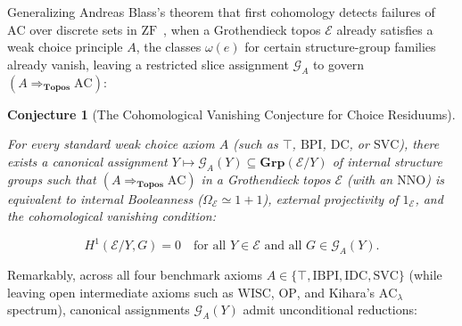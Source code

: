 \documentclass[10pt,twoside,openright]{book}
\theoremstyle{crmplain}
\newtheorem{conjecture}[theorem]{Conjecture}
\theoremstyle{crmdef}
\theoremstyle{crmremark}
\begin{document}
Generalizing Andreas Blass's theorem that first cohomology detects failures of $\mathrm{AC}$ over discrete sets in $\mathrm{ZF}$~\cite{Blass83}, when a Grothendieck topos $\mathcal{E}$ already satisfies a weak choice principle $A$, the classes $\omega(e)$ for certain structure-group families already vanish, leaving a restricted slice assignment $\mathcal{G}_A$ to govern $(A \Rightarrow_{\mathbf{Topos}} \mathrm{AC})$:

\begin{conjecture}[The Cohomological Vanishing Conjecture for Choice Residuums]\label{conj:cohom-vanishing}

For every standard weak choice axiom $A$ (such as $\top$, $\mathrm{BPI}$, $\mathrm{DC}$, or $\mathrm{SVC}$), there exists a canonical assignment $Y \mapsto \mathcal{G}_A(Y) \subseteq \mathbf{Grp}(\mathcal{E}/Y)$ of internal structure groups such that $(A \Rightarrow_{\mathbf{Topos}} \mathrm{AC})$ in a Grothendieck topos $\mathcal{E}$ (with an $\mathrm{NNO}$) is equivalent to internal Booleanness ($\Omega_{\mathcal{E}} \simeq 1+1$), external projectivity of $1_{\mathcal{E}}$, and the cohomological vanishing condition:

\[
  H^1(\mathcal{E}/Y, G) = 0 \quad \text{for all } Y \in \mathcal{E} \text{ and all } G \in \mathcal{G}_A(Y).
\]

\end{conjecture}

Remarkably, across all four benchmark axioms $A \in \{\top, \mathrm{IBPI}, \mathrm{IDC}, \mathrm{SVC}\}$ (while leaving open intermediate axioms such as $\mathrm{WISC}$, $\mathrm{OP}$, and Kihara's $\mathrm{AC}_\lambda$ spectrum), canonical assignments $\mathcal{G}_A(Y)$ admit unconditional reductions:
\end{document}

